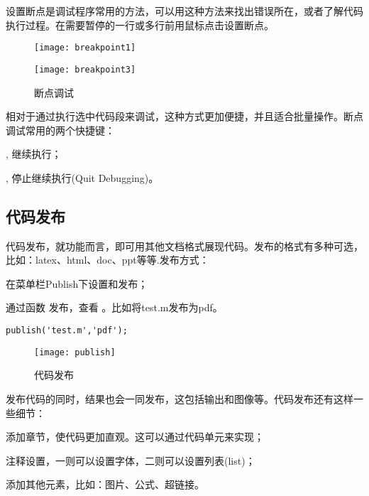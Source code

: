 设置断点是调试程序常用的方法，可以用这种方法来找出错误所在，或者了解代码执行过程。在需要暂停的一行或多行前用鼠标点击设置断点。

\begin{figure}[htbp]
  \texttt{[image: breakpoint1]}
\end{figure}

\begin{figure}[htbp]
  \texttt{[image: breakpoint3]}
  \caption{断点调试}
\end{figure}

相对于通过执行选中代码段来调试，这种方式更加便捷，并且适合批量操作。断点调试常用的两个快捷键：

\begindot
  \item {}, 继续执行；
  \item {}, 停止继续执行(Quit Debugging)。
\myenddot





\subsection{代码发布}

 代码发布，就功能而言，即可用其他文档格式展现代码。发布的格式有多种可选，比如：latex、html、doc、ppt等等.发布方式：

\begindot
  \item 在菜单栏Publish下设置和发布；
  \item 通过函数  发布，查看 。比如将test.m发布为pdf。
\myenddot

\vspace{-0.8cm}
\begin{lstlisting}[caption = 代码发布]
publish('test.m','pdf');
\end{lstlisting}

\begin{figure}[htbp]
  \texttt{[image: publish]}
  \caption{代码发布}
\end{figure}

发布代码的同时，结果也会一同发布，这包括输出和图像等。代码发布还有这样一些细节：

\begindot
  \item 添加章节，使代码更加直观。这可以通过代码单元来实现；
  \item 注释设置，一则可以设置字体，二则可以设置列表(list)；
  \item 添加其他元素，比如：图片、公式、超链接。
\myenddot

